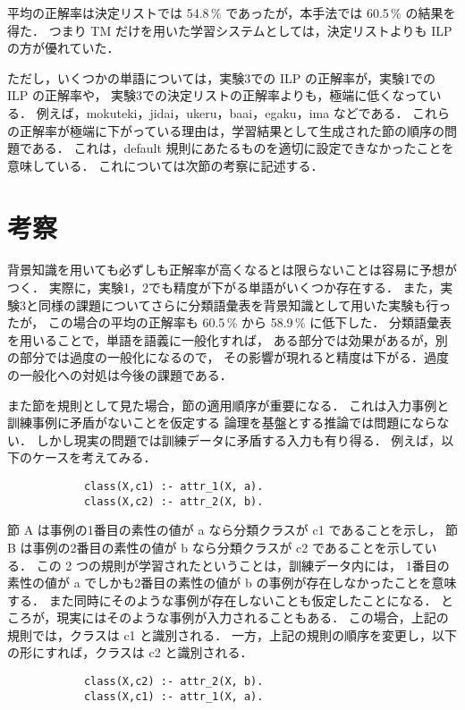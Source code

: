 平均の正解率は決定リストでは 54.8\,\% であったが，本手法では 60.5\,\% の結果を得た．
つまり TM だけを用いた学習システムとしては，決定リストよりも ILP の方が優れていた．

ただし，いくつかの単語については，実験3での ILP の正解率が，実験1での ILP の正解率や，
実験3での決定リストの正解率よりも，極端に低くなっている．
例えば，mokuteki，jidai，ukeru，baai，egaku，ima などである．
これらの正解率が極端に下がっている理由は，学習結果として生成された節の順序の問題である．
これは，default 規則にあたるものを適切に設定できなかったことを意味している．
これについては次節の考察に記述する．


\section{考察}


背景知識を用いても必ずしも正解率が高くなるとは限らないことは容易に予想がつく．
実際に，実験1，2でも精度が下がる単語がいくつか存在する．
また，実験3と同様の課題についてさらに分類語彙表を背景知識として用いた実験も行ったが，
この場合の平均の正解率も 60.5\,\% から 58.9\,\% に低下した．
分類語彙表を用いることで，単語を語義に一般化すれば，
ある部分では効果があるが，別の部分では過度の一般化になるので，
その影響が現れると精度は下がる．過度の一般化への対処は今後の課題である．

また節を規則として見た場合，節の適用順序が重要になる．
これは入力事例と訓練事例に矛盾がないことを仮定する
論理を基盤とする推論では問題にならない．
しかし現実の問題では訓練データに矛盾する入力も有り得る．
例えば，以下のケースを考えてみる．

\begin{verbatim}
            class(X,c1) :- attr_1(X, a).    
            class(X,c2) :- attr_2(X, b).    
\end{verbatim}

節 A は事例の1番目の素性の値が a なら分類クラスが c1 であることを示し，
節 B は事例の2番目の素性の値が b なら分類クラスが c2 であることを示している．
この 2 つの規則が学習されたということは，訓練データ内には，
1番目の素性の値が a でしかも2番目の素性の値が b の事例が存在しなかったことを意味する．
また同時にそのような事例が存在しないことも仮定したことになる．
ところが，現実にはそのような事例が入力されることもある．
この場合，上記の規則では，クラスは c1 と識別される．
一方，上記の規則の順序を変更し，以下の形にすれば，クラスは c2 と識別される．

\begin{verbatim}
            class(X,c2) :- attr_2(X, b).    
            class(X,c1) :- attr_1(X, a).    
\end{verbatim}

